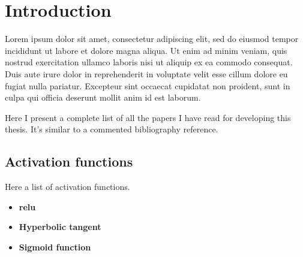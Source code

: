 

\chapter{Introduction}\label{cha:introduction}



\drop Lorem ipsum dolor sit amet, consectetur adipiscing elit, sed do eiusmod
tempor incididunt ut labore et dolore magna aliqua. Ut enim ad minim veniam,
quis nostrud exercitation ullamco laboris nisi ut aliquip ex ea commodo
consequat. Duis aute irure dolor in reprehenderit in voluptate velit esse
cillum dolore eu fugiat nulla pariatur. Excepteur sint occaecat cupidatat non
proident, sunt in culpa qui officia deserunt mollit anim id est laborum.

Here I present a complete list of all the papers I have read for developing this
thesis. It's similar to a commented bibliography reference.


\section{Activation functions}
Here a list of activation functions.


\begin{itemize}
  \item \textbf{\acf*{relu}}
  \item \textbf{Hyperbolic tangent}
  \item \textbf{Sigmoid function}
\end{itemize}

